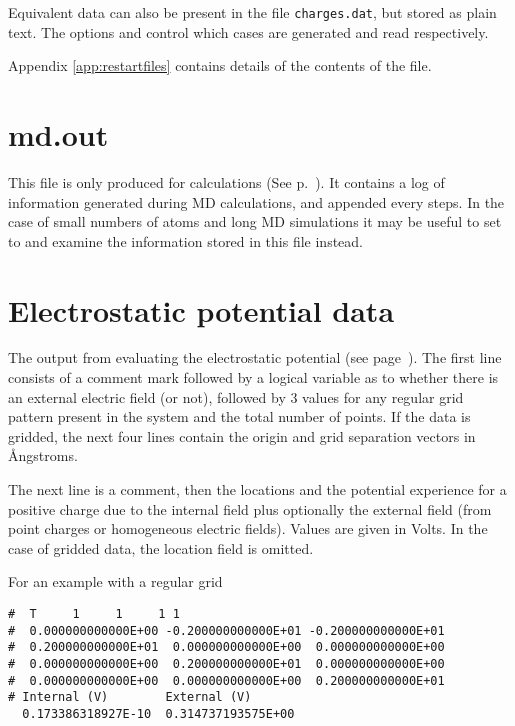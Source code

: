 Equivalent data can also be present in the file \verb|charges.dat|, but stored
as plain text. The options  and 
control which cases are generated and read respectively.

Appendix \ref{app:restartfiles} contains details of the contents of the file.

\section{md.out}
\label{sec:md.out}

This file is only produced for  calculations (See
p.~). It contains a log of information generated during MD
calculations, and appended every  steps. In the case of
small numbers of atoms and long MD simulations it may be useful to set
 to  and examine the information stored in this file
instead.

\section{Electrostatic potential data}
\label{sec:dftbp.espfile}

The output from evaluating the electrostatic potential (see
page~). The first line consists of a comment mark followed
by a logical variable as to whether there is an external electric field (or
not), followed by 3 values for any regular grid pattern present in the system
and the total number of points. If the data is gridded, the next four lines
contain the origin and grid separation vectors in {\AA}ngstroms.

The next line is a comment, then the locations and the potential experience for
a positive charge due to the internal field plus optionally the external field
(from point charges or homogeneous electric fields). Values are given in
Volts. In the case of gridded data, the location field is omitted.

For an example with a regular grid
\begin{verbatim}
#  T     1     1     1 1
#  0.000000000000E+00 -0.200000000000E+01 -0.200000000000E+01
#  0.200000000000E+01  0.000000000000E+00  0.000000000000E+00
#  0.000000000000E+00  0.200000000000E+01  0.000000000000E+00
#  0.000000000000E+00  0.000000000000E+00  0.200000000000E+01
# Internal (V)        External (V)
  0.173386318927E-10  0.314737193575E+00
\end{verbatim}

